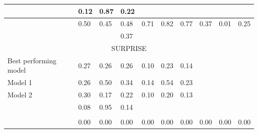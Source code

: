 \documentclass[
10pt, %
a4paper, %
oneside, %
headinclude,footinclude, %
BCOR5mm, %
]{scrartcl}
\begin{document}
\begin{table}[!htbp]
\begin{tabular}{|l|l|l|l|l|l|l|l|l|l|}
\hline
    \tiny{\citep{strapparava2008learning} } &
    \footnotesize{0.12} & 
    \footnotesize{0.87} & 
    \footnotesize{0.22} &
    &
    &
    &
    &
    &
    \\

\hline
    \tiny{\citep{kim2010evaluation} } &
    \footnotesize{0.50} & 
    \footnotesize{0.45} & 
    \footnotesize{0.48} &
    \footnotesize{0.71} & 
    \footnotesize{0.82} & 
    \footnotesize{0.77} &
    \footnotesize{0.37} & 
    \footnotesize{0.01} & 
    \footnotesize{0.25} \\

\hline
    \tiny{\citep{danisman2008feeler}} &
    \footnotesize{} & 
    \footnotesize{} & 
    \footnotesize{0.37} &
    \footnotesize{} & 
    \footnotesize{} & 
    \footnotesize{} &
    \footnotesize{} & 
    \footnotesize{} & 
    \footnotesize{} \\

\hline
    \multicolumn{10}{|c|}{{SURPRISE}} \\                               
    
\hline
  \tiny{Best performing model} & 
  \footnotesize{0.27} & 
  \footnotesize{0.26} & 
  \footnotesize{0.26} & 
  \footnotesize{0.10} & 
  \footnotesize{0.23} & 
  \footnotesize{0.14} & 
  \footnotesize{} & 
  \footnotesize{} & 
  \footnotesize{} \\ 

\hline
    \tiny{Model 1} & 
    \footnotesize{0.26} & 
    \footnotesize{0.50} & 
    \footnotesize{0.34} & 
    \footnotesize{0.14} & 
    \footnotesize{0.54} & 
    \footnotesize{0.23} & 
    \footnotesize{} & 
    \footnotesize{} & 
    \footnotesize{} \\ 

\hline
    \tiny{Model 2} & 
    \footnotesize{0.30} & 
    \footnotesize{0.17} & 
    \footnotesize{0.22} & 
    \footnotesize{0.10} & 
    \footnotesize{0.20} & 
    \footnotesize{0.13} & 
    \footnotesize{} & 
    \footnotesize{} & 
    \footnotesize{} \\ 


\hline
    \tiny{\citep{strapparava2008learning} } &
    \footnotesize{0.08} & 
    \footnotesize{0.95} & 
    \footnotesize{0.14} &
    &
    &
    &
    &
    &
    \\

\hline
    \tiny{\citep{kim2010evaluation} } &
    & 
    & 
    &
    &
    &
    &
    &
    &
    \\
    
\hline
    \tiny{\citep{danisman2008feeler} } &
    \footnotesize{0.00} & 
    \footnotesize{0.00} & 
    \footnotesize{0.00} &
    \footnotesize{0.00} & 
    \footnotesize{0.00} & 
    \footnotesize{0.00} &
    \footnotesize{0.00} & 
    \footnotesize{0.00} & 
    \footnotesize{0.00} \\


\end{tabular}
\end{table}
\end{document}
